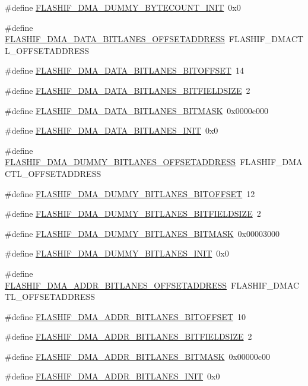 \begin{DoxyCompactItemize}
\item 
\#define \hyperlink{a00552_a129d8f82ca0c3d42e241dfe7c319b978}{FLASHIF\_\-DMA\_\-DUMMY\_\-BYTECOUNT\_\-INIT}~0x0
\item 
\#define \hyperlink{a00552_a131a40964a3ceb9cdaeaea5c3fef0542}{FLASHIF\_\-DMA\_\-DATA\_\-BITLANES\_\-OFFSETADDRESS}~FLASHIF\_\-DMACTL\_\-OFFSETADDRESS
\item 
\#define \hyperlink{a00552_a25a48b83cadd0bcb1a7ac36715392474}{FLASHIF\_\-DMA\_\-DATA\_\-BITLANES\_\-BITOFFSET}~14
\item 
\#define \hyperlink{a00552_a8e0cfa35659a7a784b94c5d1a1cfe38b}{FLASHIF\_\-DMA\_\-DATA\_\-BITLANES\_\-BITFIELDSIZE}~2
\item 
\#define \hyperlink{a00552_a4c3b39735aa0f9ed8e879bc093727475}{FLASHIF\_\-DMA\_\-DATA\_\-BITLANES\_\-BITMASK}~0x0000c000
\item 
\#define \hyperlink{a00552_a1f5bf86c5d517c805a46c86587b7b4b7}{FLASHIF\_\-DMA\_\-DATA\_\-BITLANES\_\-INIT}~0x0
\item 
\#define \hyperlink{a00552_a5ef6b44295c4abd8a97b296d13b1f49e}{FLASHIF\_\-DMA\_\-DUMMY\_\-BITLANES\_\-OFFSETADDRESS}~FLASHIF\_\-DMACTL\_\-OFFSETADDRESS
\item 
\#define \hyperlink{a00552_a327b07ae5cdc9c5fa63e3ebcb583379c}{FLASHIF\_\-DMA\_\-DUMMY\_\-BITLANES\_\-BITOFFSET}~12
\item 
\#define \hyperlink{a00552_a47731a5a608d3d62e36d2bb46450b7a2}{FLASHIF\_\-DMA\_\-DUMMY\_\-BITLANES\_\-BITFIELDSIZE}~2
\item 
\#define \hyperlink{a00552_a2c269127099d2f0bbfb436fae2b58004}{FLASHIF\_\-DMA\_\-DUMMY\_\-BITLANES\_\-BITMASK}~0x00003000
\item 
\#define \hyperlink{a00552_a13f30a8e593d09d3f12f51015f9659b1}{FLASHIF\_\-DMA\_\-DUMMY\_\-BITLANES\_\-INIT}~0x0
\item 
\#define \hyperlink{a00552_a872622286ec4680b0e019c79463b1b2c}{FLASHIF\_\-DMA\_\-ADDR\_\-BITLANES\_\-OFFSETADDRESS}~FLASHIF\_\-DMACTL\_\-OFFSETADDRESS
\item 
\#define \hyperlink{a00552_af9d6563cb3bad22ee03d64980df8f9eb}{FLASHIF\_\-DMA\_\-ADDR\_\-BITLANES\_\-BITOFFSET}~10
\item 
\#define \hyperlink{a00552_a7eeb1e5cd83f225dea30a49c47862938}{FLASHIF\_\-DMA\_\-ADDR\_\-BITLANES\_\-BITFIELDSIZE}~2
\item 
\#define \hyperlink{a00552_a63dde8e10175f932bab74ca18e3f2fe1}{FLASHIF\_\-DMA\_\-ADDR\_\-BITLANES\_\-BITMASK}~0x00000c00
\item 
\#define \hyperlink{a00552_a5707b7248141115785e2e751a3dd8d17}{FLASHIF\_\-DMA\_\-ADDR\_\-BITLANES\_\-INIT}~0x0

\end{DoxyCompactItemize}

